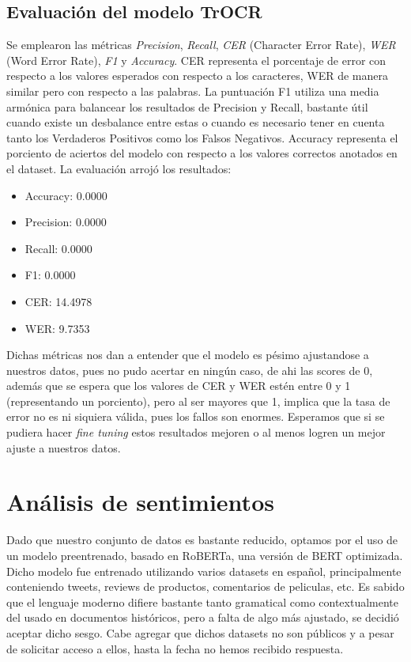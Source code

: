 \documentclass[11pt,a4paper]{article}
\begin{document}
\subsection{Evaluación del modelo TrOCR}
Se emplearon las métricas \textit{Precision}, \textit{Recall}, \textit{CER} (Character Error Rate), \textit{WER} (Word Error Rate), \textit{F1} y \textit{Accuracy}.
CER representa el porcentaje de error con respecto a los valores esperados con respecto a los caracteres, WER de manera similar pero con respecto a las palabras. 
La puntuación F1 utiliza una media armónica para balancear los resultados de Precision y Recall, bastante útil cuando existe un desbalance entre estas o cuando es necesario tener en cuenta tanto los Verdaderos Positivos como los Falsos Negativos. 
Accuracy representa el porciento de aciertos del modelo con respecto a los valores correctos anotados en el dataset.
La evaluación arrojó los resultados:

\begin{itemize}
    \item Accuracy: 0.0000
    \item Precision: 0.0000
    \item Recall: 0.0000
    \item F1: 0.0000
    \item CER: 14.4978
    \item WER: 9.7353
\end{itemize}

Dichas métricas nos dan a entender que el modelo es pésimo ajustandose a nuestros datos, pues no pudo acertar en ningún caso, de ahi las scores de 0, además que se espera que los valores de CER y WER estén entre 0 y 1 (representando un porciento), pero al ser mayores que 1, implica que la tasa de error no es ni siquiera válida, pues los fallos son enormes. 
Esperamos que si se pudiera hacer \textit{fine tuning} estos resultados mejoren o al menos logren un mejor ajuste a nuestros datos.

\section{Análisis de sentimientos}
Dado que nuestro conjunto de datos es bastante reducido, optamos por el uso de un modelo preentrenado, basado en RoBERTa, una versión de BERT optimizada. 
Dicho modelo fue entrenado utilizando varios datasets en español, principalmente conteniendo tweets, reviews de productos, comentarios de peliculas, etc. 
Es sabido que el lenguaje moderno difiere bastante tanto gramatical como contextualmente del usado en documentos históricos, pero a falta de algo más ajustado, se decidió aceptar dicho sesgo. 
Cabe agregar que dichos datasets no son públicos y a pesar de solicitar acceso a ellos, hasta la fecha no hemos recibido respuesta.
\end{document}
